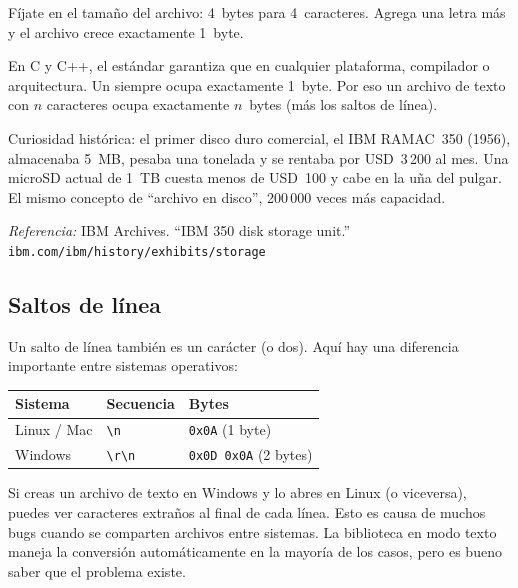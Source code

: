 \documentclass[12pt, oneside]{article}
\begin{document}
Fíjate en el tamaño del archivo: 4~bytes para 4~caracteres.  Agrega una
letra más y el archivo crece exactamente 1~byte.

\begin{tecnico}[El estándar lo garantiza: \texttt{sizeof(char) == 1}]
  En C y C++, el estándar garantiza que  en cualquier
  plataforma, compilador o arquitectura.  Un  siempre ocupa
  exactamente 1~byte.  Por eso un archivo de texto con $n$ caracteres ocupa
  exactamente $n$~bytes (más los saltos de línea).
  \par\smallskip
  Curiosidad histórica: el primer disco duro comercial, el IBM RAMAC~350
  (1956), almacenaba 5~MB, pesaba una tonelada y se rentaba por
  USD~3\,200 al mes.  Una microSD actual de 1~TB cuesta menos de USD~100
  y cabe en la uña del pulgar.  El mismo concepto de ``archivo en disco'',
  200\,000 veces más capacidad.
  \par\smallskip
  \textit{Referencia:} IBM Archives. ``IBM 350 disk storage unit.''
  \texttt{ibm.com/ibm/history/exhibits/storage}
\end{tecnico}

\subsection{Saltos de línea}

Un salto de línea también es un carácter (o dos).  Aquí hay una diferencia
importante entre sistemas operativos:

\begin{center}
\begin{tabular}{lll}
  \toprule
  \textbf{Sistema} & \textbf{Secuencia} & \textbf{Bytes} \\
  \midrule
  Linux / Mac   & \texttt{\textbackslash n}              & \texttt{0x0A} (1 byte) \\
  Windows       & \texttt{\textbackslash r\textbackslash n} & \texttt{0x0D 0x0A} (2 bytes) \\
  \bottomrule
\end{tabular}
\end{center}

\begin{advertencia}
  Si creas un archivo de texto en Windows y lo abres en Linux (o viceversa),
  puedes ver caracteres extraños al final de cada línea.  Esto es causa de
  muchos bugs cuando se comparten archivos entre sistemas.  La biblioteca
   en modo texto maneja la conversión automáticamente en la
  mayoría de los casos, pero es bueno saber que el problema existe.
\end{advertencia}
\end{document}
